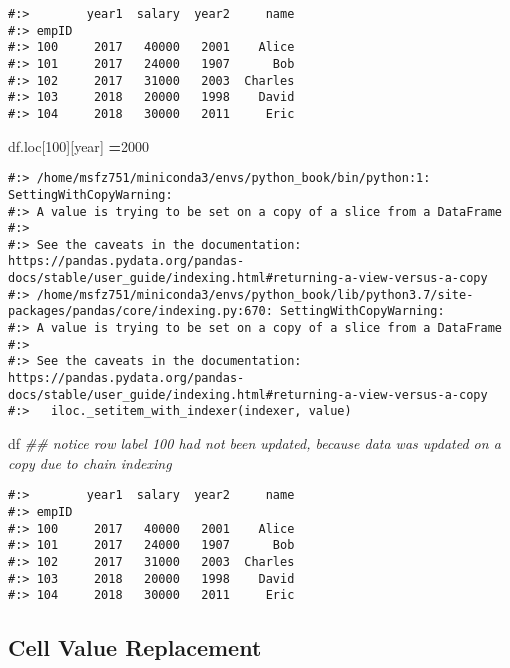 \documentclass[
]{book}
\newenvironment{Shaded}{\begin{snugshade}}{\end{snugshade}}
\newcommand{\CommentTok}[1]{\textcolor[rgb]{0.37,0.37,0.37}{\textit{#1}}}
\newcommand{\DecValTok}[1]{\textcolor[rgb]{0.06,0.06,0.06}{#1}}
\newcommand{\NormalTok}[1]{#1}
\newcommand{\OperatorTok}[1]{\textcolor[rgb]{0.43,0.43,0.43}{\textbf{#1}}}
\newcommand{\StringTok}[1]{\textcolor[rgb]{0.5,0.5,0.5}{#1}}
\begin{document}
\begin{verbatim}
#:>        year1  salary  year2     name
#:> empID                               
#:> 100     2017   40000   2001    Alice
#:> 101     2017   24000   1907      Bob
#:> 102     2017   31000   2003  Charles
#:> 103     2018   20000   1998    David
#:> 104     2018   30000   2011     Eric
\end{verbatim}

\begin{Shaded}
\begin{Highlighting}[]
\NormalTok{df.loc[}\DecValTok{100}\NormalTok{][}\StringTok{\textquotesingle{}year\textquotesingle{}}\NormalTok{] }\OperatorTok{=}\DecValTok{2000}
\end{Highlighting}
\end{Shaded}

\begin{verbatim}
#:> /home/msfz751/miniconda3/envs/python_book/bin/python:1: SettingWithCopyWarning: 
#:> A value is trying to be set on a copy of a slice from a DataFrame
#:> 
#:> See the caveats in the documentation: https://pandas.pydata.org/pandas-docs/stable/user_guide/indexing.html#returning-a-view-versus-a-copy
#:> /home/msfz751/miniconda3/envs/python_book/lib/python3.7/site-packages/pandas/core/indexing.py:670: SettingWithCopyWarning: 
#:> A value is trying to be set on a copy of a slice from a DataFrame
#:> 
#:> See the caveats in the documentation: https://pandas.pydata.org/pandas-docs/stable/user_guide/indexing.html#returning-a-view-versus-a-copy
#:>   iloc._setitem_with_indexer(indexer, value)
\end{verbatim}

\begin{Shaded}
\begin{Highlighting}[]
\NormalTok{df  }\CommentTok{\#\# notice row label 100 had not been updated, because data was updated on a copy due to chain indexing}
\end{Highlighting}
\end{Shaded}

\begin{verbatim}
#:>        year1  salary  year2     name
#:> empID                               
#:> 100     2017   40000   2001    Alice
#:> 101     2017   24000   1907      Bob
#:> 102     2017   31000   2003  Charles
#:> 103     2018   20000   1998    David
#:> 104     2018   30000   2011     Eric
\end{verbatim}

\hypertarget{cell-value-replacement}{%
\subsection{Cell Value Replacement}\label{cell-value-replacement}}
\end{document}
